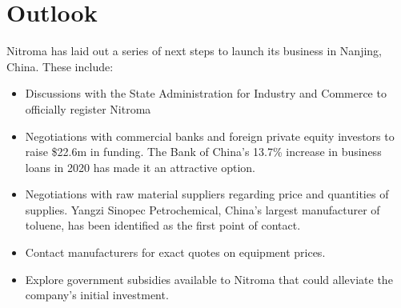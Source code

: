 \section{Outlook}
Nitroma has laid out a series of next steps to launch its business in Nanjing, China. These include:
\begin{itemize}
    \item Discussions with the State Administration for Industry and Commerce to officially register Nitroma 
    \item Negotiations with commercial banks and foreign private equity investors to raise \$22.6m in funding. The Bank of China’s 13.7\% increase in business loans in 2020 has made it an attractive option. 
    \item Negotiations with raw material suppliers regarding price and quantities of supplies. Yangzi Sinopec Petrochemical, China’s largest manufacturer of toluene, has been identified as the first point of contact\cite{sinopec_group_sinopec_2014}.
    \item Contact manufacturers for exact quotes on equipment prices.
    \item Explore government subsidies available to Nitroma that could alleviate the company’s initial investment. 
\end{itemize}




